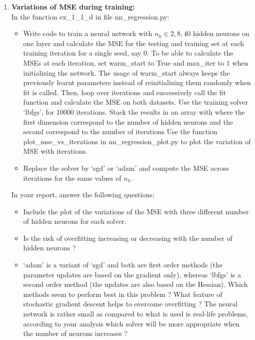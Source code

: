 \documentclass[a4paper]{article}
\begin{document}
\begin{enumerate}[label=(\alph*)]
\item \textbf{Variations of MSE during training:}\\
    In the function ex\_1\_1\_d in file nn\_regression.py:
	\begin{itemize}
        \item Write code to train a neural network with $n_h ∈ 2, 8, 40$ hidden neurons on one layer and calculate the MSE for the testing and training set at each training iteration for a single seed, say $0$. To be able to calculate the MSEs at each iteration, set warm\_start to True and max\_iter to $1$ when initializing the network. The usage of warm\_start always keeps the previously learnt parameters instead of reinitializing them randomly when fit is called. Then, loop over  iterations and successively call the fit function and calculate the MSE on both datasets. Use the training solver ‘lbfgs’, for 10000 iterations. Stack the results in an array with where the first dimension correspond to the number of hidden neurons and the second correspond to the number of iterations Use the function plot\_mse\_vs\_iterations in nn\_regression\_plot.py to plot the variation of MSE with iterations.
        \item Replace the solver by ‘sgd’ or ‘adam’ and compute the MSE across iterations for the same values of $n_h$.
	\end{itemize}
    In your report, answer the following questions:
    \begin{itemize}
        \item Include the plot of the variations of the MSE with three different number of hidden neurons for each solver.
        \item Is the risk of overfitting increasing or decreasing with the number of hidden neurons ? 	\item ‘adam’ is a variant of ‘sgd’ and both are first order methods (the parameter updates are based on the gradient only), whereas ‘lbfgs’ is a second order method (the updates are also based on the Hessian). Which methods seem to perform best in this problem ? What feature of stochastic gradient descent helps to overcome overfitting ? The neural network is rather small as compared to what is used is real-life problems, according to your analysis which solver will be more appropriate when the number of neurons increases ?
    \end{itemize}         
\end{enumerate}

\newpage
\end{document}
